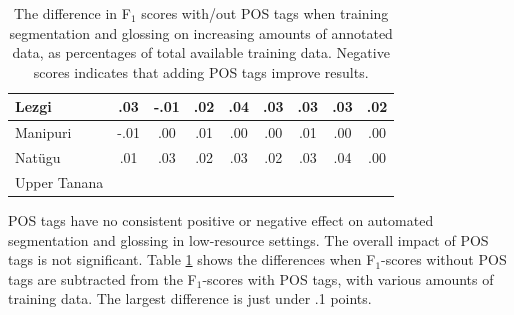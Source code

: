 \begin{table}[b]
\begin{tabular}{l|cccccccc}
       Lezgi & .03 & -.01 & .02 & .04 & .03 & .03 & .03 & .02 \\
       \hline
       Manipuri & -.01 & .00 & .01 & .00 & .00 & .01 & .00 & .00 \\
       \hline
       Nat\"ugu & .01 & .03 & .02 & .03 & .02 & .03 & .04 & .00 \\
       \hline
       Upper Tanana &  &  &  &  &  &  &  &  \\
    \end{tabular}
    \caption[Segmenting and Glossing with/out POS tags]{The difference in F$_1$ scores with/out POS tags when training segmentation and glossing on increasing amounts of annotated data, as percentages of total available training data. Negative scores indicates that adding POS tags improve results.
    }
    \label{tab:POSSG}
\end{table}

POS tags have no consistent positive or negative effect on automated segmentation and glossing in low-resource settings. The overall impact of POS tags is not significant. Table \ref{tab:POSSG} shows the differences when F$_1$-scores without POS tags are subtracted from the F$_1$-scores with POS tags, with various amounts of training data. The largest difference is just under .1 points. 

